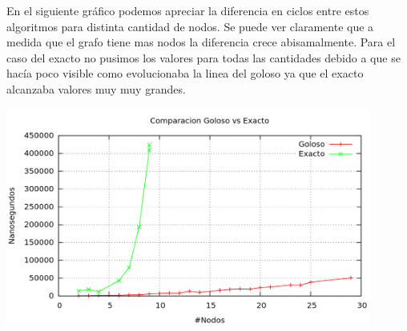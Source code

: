 En el siguiente gráfico podemos apreciar la diferencia en ciclos entre estos algoritmos para distinta cantidad de nodos. Se puede ver claramente que a medida que el grafo tiene mas nodos la diferencia crece abisamalmente. Para el caso del exacto no pusimos los valores para todas las cantidades debido a que se hacía poco visible como evolucionaba la linea del goloso ya que el exacto alcanzaba valores muy muy grandes. 
\begin{center}
  \includegraphics[width=12cm]{./graficos/comp_exacto_goloso.png}
\end{center}


